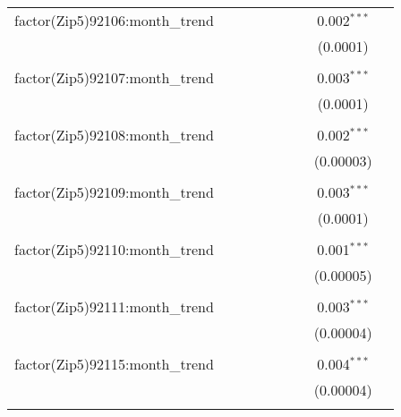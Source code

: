 \begin{table}[H]
{\begin{tabular}{@{\extracolsep{5pt}}lcccccccc}
  factor(Zip5)92106:month\_trend &  &  &  &  &  &  & 0.002$^{***}$ &  \\  

   &  &  &  &  &  &  & (0.0001) &  \\  

   & & & & & & & & \\  

  factor(Zip5)92107:month\_trend &  &  &  &  &  &  & 0.003$^{***}$ &  \\  

   &  &  &  &  &  &  & (0.0001) &  \\  

   & & & & & & & & \\  

  factor(Zip5)92108:month\_trend &  &  &  &  &  &  & 0.002$^{***}$ &  \\  

   &  &  &  &  &  &  & (0.00003) &  \\  

   & & & & & & & & \\  

  factor(Zip5)92109:month\_trend &  &  &  &  &  &  & 0.003$^{***}$ &  \\  

   &  &  &  &  &  &  & (0.0001) &  \\  

   & & & & & & & & \\  

  factor(Zip5)92110:month\_trend &  &  &  &  &  &  & 0.001$^{***}$ &  \\  

   &  &  &  &  &  &  & (0.00005) &  \\  

   & & & & & & & & \\  

  factor(Zip5)92111:month\_trend &  &  &  &  &  &  & 0.003$^{***}$ &  \\  

   &  &  &  &  &  &  & (0.00004) &  \\  

   & & & & & & & & \\  

  factor(Zip5)92115:month\_trend &  &  &  &  &  &  & 0.004$^{***}$ &  \\  

   &  &  &  &  &  &  & (0.00004) &  \\  

   & & & & & & & & \\  


\end{tabular}}
\end{table}

